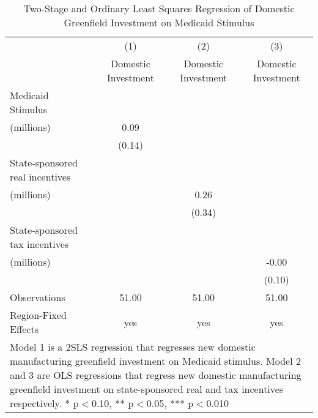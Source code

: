 \begin{table}[!htbp]\centering
\def\sym#1{\ifmmode^{#1}\else\(^{#1}\)\fi}
\caption{Two-Stage and Ordinary Least Squares Regression of Domestic Greenfield Investment on Medicaid Stimulus}
\begin{tabular}{l*{3}{c}}
\hline\hline
                    &\multicolumn{1}{c}{(1)}   &\multicolumn{1}{c}{(2)}   &\multicolumn{1}{c}{(3)}   \\
                    &Domestic Investment   &Domestic Investment   &Domestic Investment   \\
\hline
Medicaid Stimulus \\ (millions)&        0.09   &               &               \\
                    &      (0.14)   &               &               \\
State-sponsored real incentives \\ (millions)&               &        0.26   &               \\
                    &               &      (0.34)   &               \\
State-sponsored tax incentives \\ (millions)&               &               &       -0.00   \\
                    &               &               &      (0.10)   \\
\hline
Observations        &       51.00   &       51.00   &       51.00   \\
Region-Fixed Effects&         yes   &         yes   &         yes   \\
\hline\hline
\multicolumn{4}{p{0.75\linewidth}}{\footnotesize Model 1 is a 2SLS regression that regresses new domestic manufacturing greenfield investment on Medicaid stimulus. Model 2 and 3 are OLS regressions that regress new domestic manufacturing greenfield investment on state-sponsored real and tax incentives respectively. * p$<$0.10, ** p$<$0.05, *** p$<$0.010}\\
\end{tabular}
\end{table}
